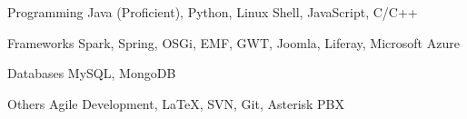 

\begin{cvskills}

  \cvskill
    {Programming} %
    {Java (Proficient), Python, Linux Shell, JavaScript, C/C++} %

  \cvskill
    {Frameworks} %
    {Spark, Spring, OSGi, EMF, GWT, Joomla, Liferay, Microsoft Azure} %

  \cvskill
    {Databases} %
    {MySQL, MongoDB} %


  \cvskill
  {Others} %
  {Agile Development, {\LaTeX}, SVN, Git, Asterisk PBX} %
  
\end{cvskills}

